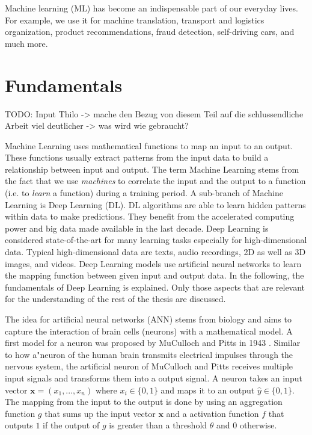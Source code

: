 



Machine learning (ML) has become an indispensable part of our everyday lives.
For example, we use it for machine translation, transport and logistics organization, product recommendations, fraud detection, self-driving cars, and much more.


\section{Fundamentals}

TODO: Input Thilo -> mache den Bezug von diesem Teil auf die schlussendliche Arbeit viel deutlicher -> was wird wie gebraucht?

Machine Learning uses mathematical functions to map an input to an output.
These functions usually extract patterns from the input data to build a relationship between input and output.
The term Machine Learning stems from the fact that we use \emph{machines} to correlate the input and the output to a function (i.e. to \emph{learn} a function) during a training period.
A sub-branch of Machine Learning is Deep Learning (DL).
DL algorithms are able to learn hidden patterns within data to make predictions.
They benefit from the accelerated computing power and big data made available in the last decade.
Deep Learning is considered state-of-the-art for many learning tasks especially for high-dimensional data.
Typical high-dimensional data are texts, audio recordings, 2D as well as 3D images, and videos.
Deep Learning models use artificial neural networks to learn the mapping function between given input and output data.
In the following, the fundamentals of Deep Learning is explained.
Only those aspects that are relevant for the understanding of the rest of the thesis are discussed.

The idea for artificial neural networks (ANN) stems from biology and aims to capture the interaction of brain cells (neurons) with a mathematical model.
A first model for a neuron was proposed by MuCulloch and Pitts in 1943 .
Similar to how a"neuron of the human brain transmits electrical impulses through the nervous system, the artificial neuron of MuCulloch and Pitts receives multiple input signals and transforms them into a output signal.
A neuron takes an input vector \(\boldsymbol{x} = (x_1, ..., x_n)\) where \(x_i \in \{0, 1\}\) and maps it to an output \(\hat{y} \in \{0, 1\}\).
The mapping from the input to the output is done by using an aggregation function \(g\) that sums up the input vector \(\boldsymbol{x}\) and a activation function \(f\) that outputs \(1\) if the output of \(g\) is greater than a threshold \(\theta\) and \(0\) otherwise.

